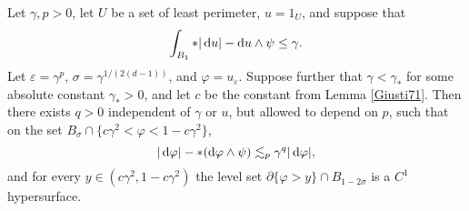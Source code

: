 \begin{lemma}\label{main mollifier lemma}
Let $\gamma, p > 0$, let $U$ be a set of least perimeter, $u = 1_U$, and suppose that
\begin{equation}\label{hypothesis on main mollifier lemma}
\int_{B_1} *|\mathop{}\!\mathrm{d} u| - \mathop{}\!\mathrm{d} u \wedge \psi \leq \gamma.
\end{equation}
Let $\varepsilon = \gamma^p$, $\sigma = \gamma^{1/(2(d - 1))}$, and $\varphi = u_\varepsilon$.
Suppose further that $\gamma < \gamma_*$ for some absolute constant $\gamma_* > 0$, and let $c$ be the constant from Lemma \ref{Giusti71}.
Then there exists $q > 0$ independent of $\gamma$ or $u$, but allowed to depend on $p$, such that on the set $B_\sigma \cap \{c\gamma^2 < \varphi < 1 - c\gamma^2\}$,
\begin{equation}\label{claim on main mollifier lemma}
|\mathop{}\!\mathrm{d} \varphi| - *(\mathop{}\!\mathrm{d} \varphi \wedge \psi) \lesssim_p \gamma^q |\mathop{}\!\mathrm{d} \varphi|,
\end{equation}
and for every $y \in (c\gamma^2, 1 - c\gamma^2)$ the level set $\partial \{\varphi > y\} \cap B_{1 - 2\sigma}$ is a $C^1$ hypersurface.
\end{lemma}
